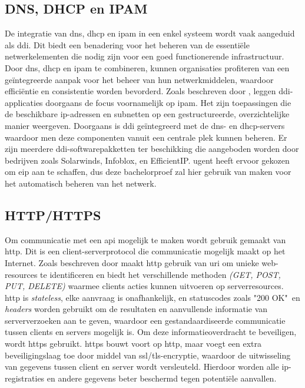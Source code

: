 \subsection{DNS, DHCP en IPAM}
De integratie van \acrshort{dns}, \acrshort{dhcp} en \acrshort{ipam} in een enkel systeem wordt vaak aangeduid als \acrshort{ddi}. Dit biedt een benadering voor het beheren van de essentiële netwerkelementen die nodig zijn voor een goed functionerende infrastructuur. Door \acrshort{dns}, \acrshort{dhcp} en \acrshort{ipam} te combineren, kunnen organisaties profiteren van een geïntegreerde aanpak voor het beheer van hun netwerkmiddelen, waardoor efficiëntie en consistentie worden bevorderd. Zoals beschreven door \textcite{Fontein2023}, leggen \acrshort{ddi}-applicaties doorgaans de focus voornamelijk op \acrshort{ipam}. Het zijn toepassingen die de beschikbare \acrshort{ip}-adressen en subnetten op een gestructureerde, overzichtelijke manier weergeven. Doorgaans is \acrshort{ddi} geïntegreerd met de \acrshort{dns}- en \acrshort{dhcp}-servers waardoor men deze componenten vanuit een centrale plek kunnen beheren. Er zijn meerdere \acrshort{ddi}-softwarepakketten ter beschikking die aangeboden worden door bedrijven zoals Solarwinds, Infoblox, en EfficientIP. \acrshort{ugent} heeft ervoor gekozen om \acrlong{eip} aan te schaffen, dus deze bachelorproef zal hier gebruik van maken voor het automatisch beheren van het netwerk.

\subsection{HTTP/HTTPS}
Om communicatie met een \acrshort{api} mogelijk te maken wordt gebruik gemaakt van \acrfull{http}. Dit is een client-serverprotocol die communicatie mogelijk maakt op het Internet. Zoals beschreven door \textcite{Fielding2014} maakt \acrshort{http} gebruik van \acrfull{uri} om unieke web-resources te identificeren en biedt het verschillende methoden \textit{(GET, POST, PUT, DELETE)} waarmee clients acties kunnen uitvoeren op serverresources. \acrshort{http} is \textit{stateless}, elke aanvraag is onafhankelijk, en statuscodes zoals "200 OK"\ en \textit{headers} worden gebruikt om de resultaten en aanvullende informatie van serververzoeken aan te geven, waardoor een gestandaardiseerde communicatie tussen clients en servers mogelijk is.
Om deze informatieoverdracht te beveiligen, wordt \acrfull{https} gebruikt. \acrshort{https} bouwt voort op \acrshort{http}, maar voegt een extra beveiligingslaag toe door middel van \acrshort{ssl}/\acrshort{tls}-encryptie, waardoor de uitwisseling van gegevens tussen client en server wordt versleuteld. Hierdoor worden alle \acrshort{ip}-registraties en andere gegevens beter beschermd tegen potentiële aanvallen.

